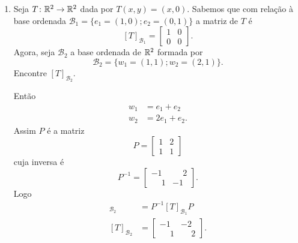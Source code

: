 \begin{exemplos}
\begin{enumerate}[label={\arabic*})]
    \item Seja $T \colon \mathbb{R}^2 \to \mathbb{R}^2$ dada por $T(x,y) = (x,0)$. Sabemos que com relação à base ordenada $\mathcal{B}_1 = \{e_1=(1,0);e_2=(0,1)\}$ a matriz de $T$ é
    \[
      [T]_{\mathcal{B}_1} = \begin{bmatrix}
        1 & 0\\
        0 & 0
      \end{bmatrix}.
    \]
    Agora, seja $\mathcal{B}_2$ a base ordenada de $\mathbb{R}^2$ formada por
    \[
      \mathcal{B}_2 = \{w_1 = (1,1);w_2=(2,1)\}.
    \]
    Encontre $[T]_{\mathcal{B}_2}$.
    \begin{solucao}
      Então
      \begin{align*}
        w_1 &= e_1 + e_2\\
        w_2 &= 2e_1 + e_2.
      \end{align*}
      Assim $P$ é a matriz
      \[
        P = \begin{bmatrix}
          1 & 2\\
          1 & 1
        \end{bmatrix}
      \]
      cuja inversa é
      \[
        P^{-1} = \begin{bmatrix}
          -1 & \phantom{-}2\\
          \phantom{-}1 & -1
        \end{bmatrix}.
      \]
      Logo
      \begin{align*}
        [T]_{\mathcal{B}_2} &= P^{-1}[T]_{\mathcal{B}_1}P\\
        [T]_{\mathcal{B}_2} &= \begin{bmatrix}
          -1 & -2\\
          \phantom{-}1 & \phantom{-}2
        \end{bmatrix}.
      \end{align*}
    \end{solucao}


\end{enumerate}
\end{exemplos}
